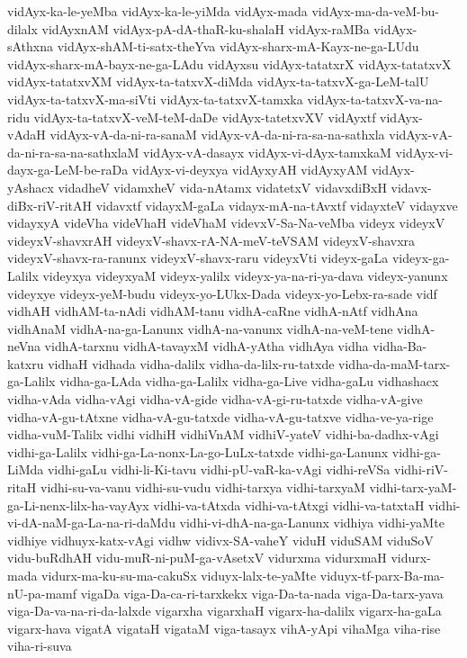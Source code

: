 {vidAyx-ka-le-yeMba
vidAyx-ka-le-yiMda
vidAyx-mada
vidAyx-ma-da-veM-bu-dilalx
vidAyxnAM
vidAyx-pA-dA-thaR-ku-shalaH
vidAyx-raMBa
vidAyx-sAthxna
vidAyx-shAM-ti-satx-theYva
vidAyx-sharx-mA-Kayx-ne-ga-LUdu
vidAyx-sharx-mA-bayx-ne-ga-LAdu
vidAyxsu
vidAyx-tatatxrX
vidAyx-tatatxvX
vidAyx-tatatxvXM
vidAyx-ta-tatxvX-diMda
vidAyx-ta-tatxvX-ga-LeM-talU
vidAyx-ta-tatxvX-ma-siVti
vidAyx-ta-tatxvX-tamxka
vidAyx-ta-tatxvX-va-na-ridu
vidAyx-ta-tatxvX-veM-teM-daDe
vidAyx-tatetxvXV
vidAyxtf
vidAyx-vAdaH
vidAyx-vA-da-ni-ra-sanaM
vidAyx-vA-da-ni-ra-sa-na-sathxla
vidAyx-vA-da-ni-ra-sa-na-sathxlaM
vidAyx-vA-dasayx
vidAyx-vi-dAyx-tamxkaM
vidAyx-vi-dayx-ga-LeM-be-raDa
vidAyx-vi-deyxya
vidAyxyAH
vidAyxyAM
vidAyx-yAshacx
vidadheV
vidamxheV
vida-nAtamx
vidatetxV
vidavxdiBxH
vidavx-diBx-riV-ritAH
vidavxtf
vidayxM-gaLa
vidayx-mA-na-tAvxtf
vidayxteV
vidayxve
vidayxyA
videVha
videVhaH
videVhaM
videvxV-Sa-Na-veMba
videyx
videyxV
videyxV-shavxrAH
videyxV-shavx-rA-NA-meV-teVSAM
videyxV-shavxra
videyxV-shavx-ra-ranunx
videyxV-shavx-raru
videyxVti
videyx-gaLa
videyx-ga-Lalilx
videyxya
videyxyaM
videyx-yalilx
videyx-ya-na-ri-ya-dava
videyx-yanunx
videyxye
videyx-yeM-budu
videyx-yo-LUkx-Dada
videyx-yo-Lebx-ra-sade
vidf
vidhAH
vidhAM-ta-nAdi
vidhAM-tanu
vidhA-caRne
vidhA-nAtf
vidhAna
vidhAnaM
vidhA-na-ga-Lanunx
vidhA-na-vanunx
vidhA-na-veM-tene
vidhA-neVna
vidhA-tarxnu
vidhA-tavayxM
vidhA-yAtha
vidhAya
vidha
vidha-Ba-katxru
vidhaH
vidhada
vidha-dalilx
vidha-da-lilx-ru-tatxde
vidha-da-maM-tarx-ga-Lalilx
vidha-ga-LAda
vidha-ga-Lalilx
vidha-ga-Live
vidha-gaLu
vidhashacx
vidha-vAda
vidha-vAgi
vidha-vA-gide
vidha-vA-gi-ru-tatxde
vidha-vA-give
vidha-vA-gu-tAtxne
vidha-vA-gu-tatxde
vidha-vA-gu-tatxve
vidha-ve-ya-rige
vidha-vuM-Talilx
vidhi
vidhiH
vidhiVnAM
vidhiV-yateV
vidhi-ba-dadhx-vAgi
vidhi-ga-Lalilx
vidhi-ga-La-nonx-La-go-LuLx-tatxde
vidhi-ga-Lanunx
vidhi-ga-LiMda
vidhi-gaLu
vidhi-li-Ki-tavu
vidhi-pU-vaR-ka-vAgi
vidhi-reVSa
vidhi-riV-ritaH
vidhi-su-va-vanu
vidhi-su-vudu
vidhi-tarxya
vidhi-tarxyaM
vidhi-tarx-yaM-ga-Li-nenx-lilx-ha-vayAyx
vidhi-va-tAtxda
vidhi-va-tAtxgi
vidhi-va-tatxtaH
vidhi-vi-dA-naM-ga-La-na-ri-daMdu
vidhi-vi-dhA-na-ga-Lanunx
vidhiya
vidhi-yaMte
vidhiye
vidhuyx-katx-vAgi
vidhw
vidivx-SA-vaheY
viduH
viduSAM
viduSoV
vidu-buRdhAH
vidu-muR-ni-puM-ga-vAsetxV
vidurxma
vidurxmaH
vidurx-mada
vidurx-ma-ku-su-ma-cakuSx
viduyx-lalx-te-yaMte
viduyx-tf-parx-Ba-ma-nU-pa-mamf
vigaDa
viga-Da-ca-ri-tarxkekx
viga-Da-ta-nada
viga-Da-tarx-yava
viga-Da-va-na-ri-da-lalxde
vigarxha
vigarxhaH
vigarx-ha-dalilx
vigarx-ha-gaLa
vigarx-hava
vigatA
vigataH
vigataM
viga-tasayx
vihA-yApi
vihaMga
viha-rise
viha-ri-suva
}
